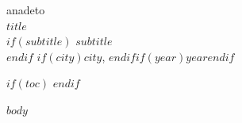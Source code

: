 \documentclass[12pt]{extarticle}
\begin{document}
\begin{titlepage}
\thispagestyle{empty}
\begin{center}
\vspace*{1cm}
anadeto\\[2.5cm]
{\bfseries\LARGE $title$}\\[0.8cm]
$if(subtitle)$
{\Large $subtitle$}\\[2.5cm]
$endif$
\vfill
$if(city)$$city$, $endif$$if(year)$$year$$endif$
\end{center}
\end{titlepage}

\pagestyle{fancy}

$if(toc)$
\tableofcontents
\newpage
$endif$

$body$
\end{document}
